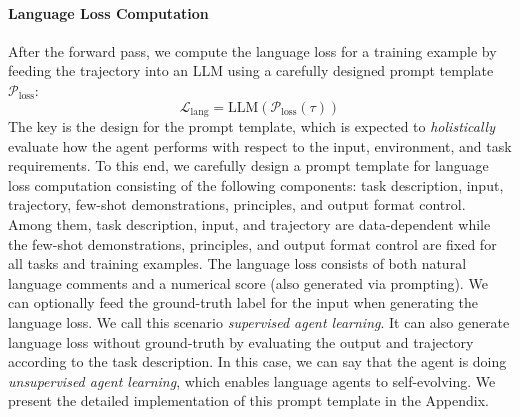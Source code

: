 \documentclass{article}
\newcommand{\Trajectory}{\tau}
\newcommand{\LanguageLoss}{\mathcal{L}_{\text{lang}}}
\begin{document}
\paragraph{Language Loss Computation}
After the forward pass, we compute the language loss for a training example by feeding the trajectory into an LLM using a carefully designed prompt template $\mathcal{P}_{\text{loss}}$: 
\begin{equation}
    \LanguageLoss = \text{LLM}( \mathcal{P}_{\text{loss}}(\Trajectory))
\end{equation}
The key is the design for the prompt template, which is expected to \textit{holistically} evaluate how the agent performs with respect to the input, environment, and task requirements. To this end, we carefully design a prompt template for language loss computation consisting of the following components: task description, input, trajectory, few-shot demonstrations, principles, and output format control. Among them, task description, input, and trajectory are data-dependent while the few-shot demonstrations, principles, and output format control are fixed for all tasks and training examples. The language loss consists of both natural language comments and a numerical score (also generated via prompting). We can optionally feed the ground-truth label for the input when generating the language loss. We call this scenario \textit{supervised agent learning}. It can also generate language loss without ground-truth by evaluating the output and trajectory according to the task description. In this case, we can say that the agent is doing \textit{unsupervised agent learning}, which enables language agents to self-evolving.
We present the detailed implementation of this prompt template in the Appendix.
\end{document}
